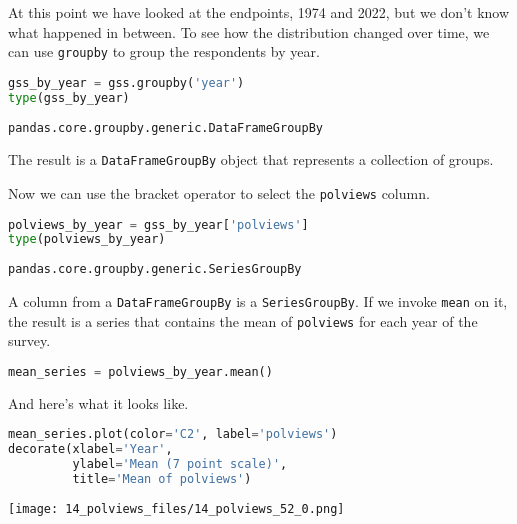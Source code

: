 At this point we have looked at the endpoints, 1974 and 2022, but we
don't know what happened in between. To see how the distribution changed
over time, we can use \passthrough{\lstinline!groupby!} to group the
respondents by year.


\begin{lstlisting}[language=Python,style=source]
gss_by_year = gss.groupby('year')
type(gss_by_year)
\end{lstlisting}

\begin{lstlisting}[style=output]
pandas.core.groupby.generic.DataFrameGroupBy
\end{lstlisting}

The result is a \passthrough{\lstinline!DataFrameGroupBy!} object that
represents a collection of groups.

Now we can use the bracket operator to select the
\passthrough{\lstinline!polviews!} column.

\begin{lstlisting}[language=Python,style=source]
polviews_by_year = gss_by_year['polviews']
type(polviews_by_year)
\end{lstlisting}

\begin{lstlisting}[style=output]
pandas.core.groupby.generic.SeriesGroupBy
\end{lstlisting}

A column from a \passthrough{\lstinline!DataFrameGroupBy!} is a
\passthrough{\lstinline!SeriesGroupBy!}. If we invoke
\passthrough{\lstinline!mean!} on it, the result is a series that
contains the mean of \passthrough{\lstinline!polviews!} for each year of
the survey.

\begin{lstlisting}[language=Python,style=source]
mean_series = polviews_by_year.mean()
\end{lstlisting}

And here's what it looks like.

\begin{lstlisting}[language=Python,style=source]
mean_series.plot(color='C2', label='polviews')
decorate(xlabel='Year',
         ylabel='Mean (7 point scale)',
         title='Mean of polviews')
\end{lstlisting}

\begin{center}
\texttt{[image: 14\_polviews\_files/14\_polviews\_52\_0.png]}
\end{center}

